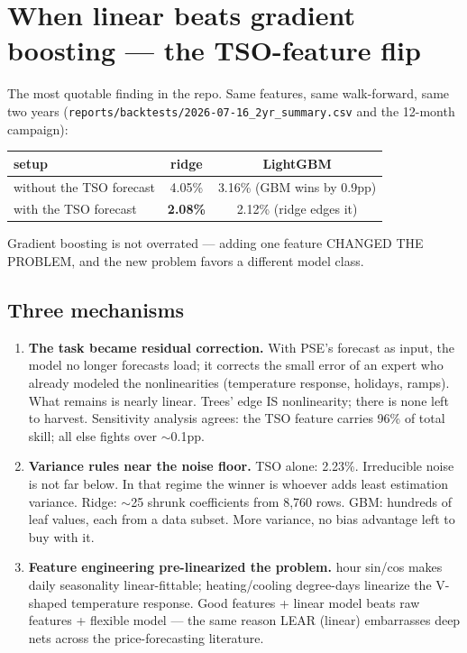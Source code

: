 \section{When linear beats gradient boosting --- the TSO-feature flip}

The most quotable finding in the repo. Same features, same walk-forward,
same two years (\texttt{reports/backtests/2026-07-16\_2yr\_summary.csv}
and the 12-month campaign):

\begin{center}
\begin{tabular}{lcc}
setup & ridge & LightGBM \\
\hline
without the TSO forecast & 4.05\% & 3.16\% \quad (GBM wins by 0.9pp) \\
with the TSO forecast    & \textbf{2.08\%} & 2.12\% \quad (ridge edges it) \\
\end{tabular}
\end{center}

Gradient boosting is not overrated --- adding one feature CHANGED THE
PROBLEM, and the new problem favors a different model class.

\subsection{Three mechanisms}

\begin{enumerate}
  \item \textbf{The task became residual correction.} With PSE's
        forecast as input, the model no longer forecasts load; it
        corrects the small error of an expert who already modeled the
        nonlinearities (temperature response, holidays, ramps). What
        remains is nearly linear. Trees' edge IS nonlinearity; there is
        none left to harvest. Sensitivity analysis agrees: the TSO
        feature carries 96\% of total skill; all else fights over
        $\sim$0.1pp.
  \item \textbf{Variance rules near the noise floor.} TSO alone: 2.23\%.
        Irreducible noise is not far below. In that regime the winner is
        whoever adds least estimation variance. Ridge: $\sim$25 shrunk
        coefficients from 8{,}760 rows. GBM: hundreds of leaf values,
        each from a data subset. More variance, no bias advantage left
        to buy with it.
  \item \textbf{Feature engineering pre-linearized the problem.}
        hour sin/cos makes daily seasonality linear-fittable;
        heating/cooling degree-days linearize the V-shaped temperature
        response. Good features + linear model beats raw features +
        flexible model --- the same reason LEAR (linear) embarrasses deep
        nets across the price-forecasting literature.
\end{enumerate}

